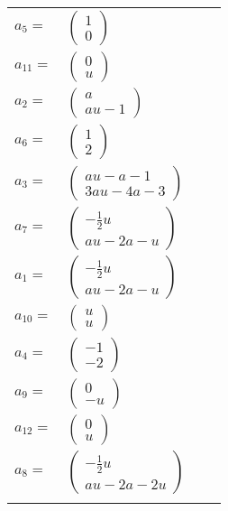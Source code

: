 \documentclass[1p]{elsarticle_modified}
\theoremstyle{definition}
\begin{document}
\begin{tabular}{m{7pt} m{180pt} m{7pt} m{180pt} }
\flushright $a_{5}=$&$\begin{pmatrix}1\\0\end{pmatrix}$ \\
\flushright $a_{11}=$&$\begin{pmatrix}0\\u\end{pmatrix}$ \\
\flushright $a_{2}=$&$\begin{pmatrix}a\\a u-1\end{pmatrix}$ \\
\flushright $a_{6}=$&$\begin{pmatrix}1\\2\end{pmatrix}$ \\
\flushright $a_{3}=$&$\begin{pmatrix}a u- a-1\\3 a u-4 a-3\end{pmatrix}$ \\
\flushright $a_{7}=$&$\begin{pmatrix}-\frac{1}{2} u\\a u-2 a- u\end{pmatrix}$ \\
\flushright $a_{1}=$&$\begin{pmatrix}-\frac{1}{2} u\\a u-2 a- u\end{pmatrix}$ \\
\flushright $a_{10}=$&$\begin{pmatrix}u\\u\end{pmatrix}$ \\
\flushright $a_{4}=$&$\begin{pmatrix}-1\\-2\end{pmatrix}$ \\
\flushright $a_{9}=$&$\begin{pmatrix}0\\- u\end{pmatrix}$ \\
\flushright $a_{12}=$&$\begin{pmatrix}0\\u\end{pmatrix}$ \\
\flushright $a_{8}=$&$\begin{pmatrix}-\frac{1}{2} u\\a u-2 a-2 u\end{pmatrix}$\\&\end{tabular}
\end{document}
